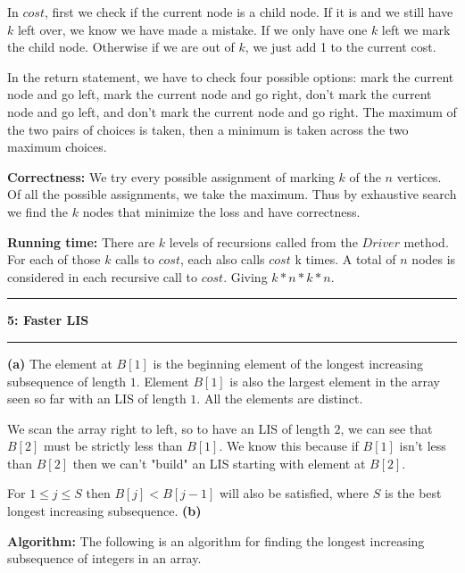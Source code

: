 \documentclass[11pt]{article}
\newcommand\question[2]{\vspace{.25in}\hrule\textbf{#1: #2}\vspace{.5em}\hrule\vspace{.10in}}
\renewcommand\part[1]{\vspace{.10in}\textbf{(#1)}}
\newcommand\algorith{\vspace{.10in}\textbf{Algorithm: }}
\newcommand\correctness{\vspace{.10in}\textbf{Correctness: }}
\newcommand\runtime{\vspace{.10in}\textbf{Running time: }}
\begin{document}
In $cost$, first we check if the current node is a child node. If it is and we still have $k$ left over, we know we have made a mistake. If we only have one $k$ left we mark the child node. Otherwise if we are out of $k$, we just add 1 to the current cost.

In the return statement, we have to check four possible options: mark the current node and go left, mark the current node and go right, don't mark the current node and go left, and don't mark the current node and go right. The maximum of the two pairs of choices is taken, then a minimum is taken across the two maximum choices.

\correctness We try every possible assignment of marking $k$ of the $n$ vertices. Of all the possible assignments, we take the maximum. Thus by exhaustive search we find the $k$ nodes that minimize the loss and have correctness.

\runtime There are $k$ levels of recursions called from the $Driver$ method. For each of those $k$ calls to $cost$, each also calls $cost$ k times. A total of $n$ nodes is considered in each recursive call to $cost$. Giving $k * n * k * n$.


\question{5}{Faster LIS}

\part{a} The element at $B[1]$ is the beginning element of the longest increasing subsequence of length $1$. Element $B[1]$ is also the largest element in the array seen so far with an LIS of length $1$. All the elements are distinct. 

We scan the array right to left, so to have an LIS of length $2$, we can see that $B[2]$ must be strictly less than $B[1]$. We know this because if $B[1]$ isn't less than $B[2]$ then we can't "build" an LIS starting with element at $B[2]$.

For $1 \leq j \leq S$ then $B[j] < B[j-1]$ will also be satisfied, where $S$ is the best longest increasing subsequence.
\newpage
\part{b}

\algorith The following is an algorithm for finding the longest increasing subsequence of integers in an array.
\end{document}

